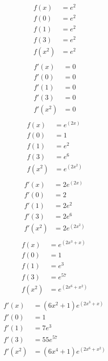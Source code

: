 \begin{align*}
f(x) &= {{e}^{2}}\\
f(0) &= {{e}^{2}}\\ 
f(1) &= {{e}^{2}}\\ 
f(3) &= {{e}^{2}}\\ 
f(x^2) &= {{e}^{2}}\\
\end{align*}
\begin{align*}
f'(x) &= 0\\
f'(0) &= 0\\ 
f'(1) &= 0\\
f'(3) &= 0\\ 
f'(x^2) &= 0\\
\end{align*}
\begin{align*}
f(x) &= {{e}^{\left(2x\right)}}\\
f(0) &= 1\\ 
f(1) &= {{e}^{2}}\\ 
f(3) &= {{e}^{6}}\\ 
f(x^2) &= {{e}^{\left(2{{x}^{2}}\right)}}\\
\end{align*}
\begin{align*}
f'(x) &= 2{{e}^{\left(2x\right)}}\\
f'(0) &= 2\\ 
f'(1) &= 2{{e}^{2}}\\
f'(3) &= 2{{e}^{6}}\\ 
f'(x^2) &= 2{{e}^{\left(2{{x}^{2}}\right)}}\\
\end{align*}
\begin{align*}
f(x) &= {{e}^{\left(2{{x}^{3}}+x\right)}}\\
f(0) &= 1\\ 
f(1) &= {{e}^{3}}\\ 
f(3) &= {{e}^{57}}\\ 
f(x^2) &= {{e}^{\left(2{{x}^{6}}+{{x}^{2}}\right)}}\\
\end{align*}
\begin{align*}
f'(x) &= (6{{x}^{2}}+1){{e}^{\left(2{{x}^{3}}+x\right)}}\\
f'(0) &= 1\\ 
f'(1) &= 7{{e}^{3}}\\
f'(3) &= 55{{e}^{57}}\\ 
f'(x^2) &= (6{{x}^{4}}+1){{e}^{\left(2{{x}^{6}}+{{x}^{2}}\right)}}\\
\end{align*}
